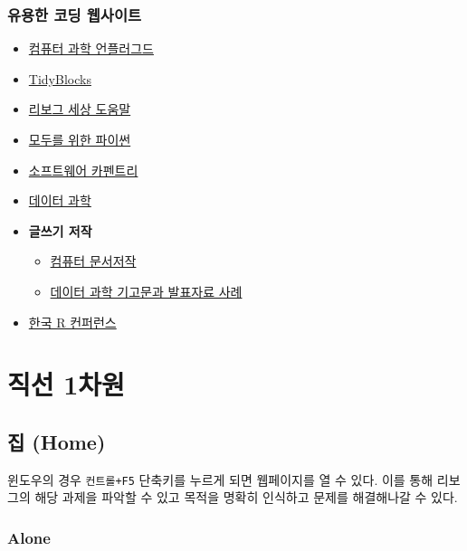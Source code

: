 \documentclass[
  b5paperpaper,
  DIV=11,
  numbers=noendperiod]{scrreprt}
\providecommand{\tightlist}{%
  \setlength{\itemsep}{0pt}\setlength{\parskip}{0pt}}\usepackage{longtable,booktabs,array}
\begin{document}
\hypertarget{useful-website}{%
\section*{유용한 코딩 웹사이트}\label{useful-website}}


\begin{itemize}
\item
  \href{https://statkclee.github.io/unplugged/}{컴퓨터 과학 언플러그드}
\item
  \href{https://tidyblocks.tech/}{TidyBlocks}
\item
  \href{https://reeborg.ca/docs/ko/}{리보그 세상 도움말}
\item
  \href{https://statkclee.github.io/pythonlearn-kr/}{모두를 위한 파이썬}
\item
  \href{http://statkclee.github.io/swcarpentry-version-5-3-new/}{소프트웨어
  카펜트리}
\item
  \href{http://statkclee.github.io/data-science/}{데이터 과학}
\item
  \textbf{글쓰기 저작}

  \begin{itemize}
  \tightlist
  \item
    \href{https://statkclee.github.io/comp_document/}{컴퓨터 문서저작}
  \item
    \href{https://statkclee.github.io/ds-authoring/}{데이터 과학
    기고문과 발표자료 사례}
  \end{itemize}
\item
  \href{https://use-r.kr/}{한국 R 컨퍼런스}
\end{itemize}

\part{직선 1차원}

\hypertarget{intro}{%
\chapter{집 (Home)}\label{intro}}

윈도우의 경우 \texttt{컨트롤+F5} 단축키를 누르게 되면 웹페이지를 열 수
있다. 이를 통해 리보그의 해당 과제을 파악할 수 있고 목적을 명확히
인식하고 문제를 해결해나갈 수 있다.

\hypertarget{alone}{%
\section{Alone}\label{alone}}
\end{document}
